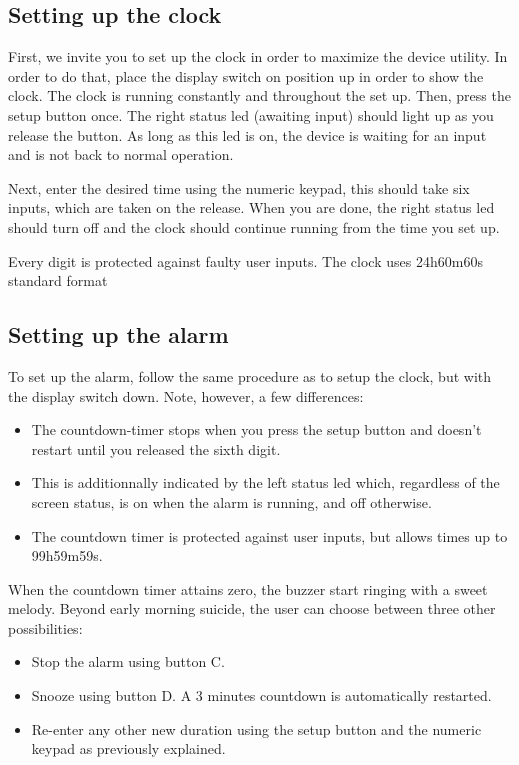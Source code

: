 \subsection{Setting up the clock}
First, we invite you to set up the clock in order to maximize the device utility.
In order to do that, place the display switch on position up in order to show the clock.
The clock is running constantly and throughout the set up.
Then, press the setup button once.
The right status led (awaiting input) should light up as you release the button.
As long as this led is on, the device is waiting for an input and is not back to normal operation.

Next, enter the desired time using the numeric keypad, this should take six inputs, which are taken on the release.
When you are done, the right status led should turn off and the clock should continue running from the time you set up.

Every digit is protected against faulty user inputs. The clock uses 24h60m60s standard format

\subsection{Setting up the alarm}
To set up the alarm, follow the same procedure as to setup the clock, but with the display switch down.
Note, however, a few differences:
\begin{itemize}
    \item The countdown-timer stops when you press the setup button and doesn't restart until you released the sixth digit.
    \item This is additionnally indicated by the left status led which, regardless of the screen status, is on when the alarm is running, and off otherwise.
    \item The countdown timer is protected against user inputs, but allows times up to 99h59m59s.
\end{itemize}

When the countdown timer attains zero, the buzzer start ringing with a sweet melody. Beyond early morning suicide, the user can choose between three other possibilities:
\begin{itemize}
    \item Stop the alarm using button C.
    \item Snooze using button D. A 3 minutes countdown is automatically restarted.
    \item Re-enter any other new duration using the setup button and the numeric keypad as previously explained.
\end{itemize}

